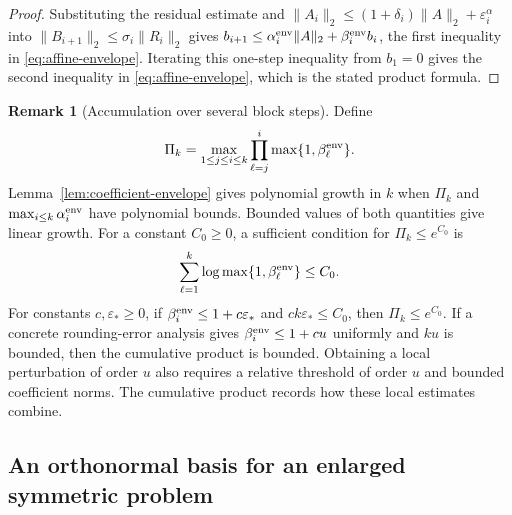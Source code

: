 \documentclass[11pt]{article}
\theoremstyle{definition}
\newtheorem{remark}{Remark}
\newcommand{\eps}{\varepsilon}
\begin{document}
\begin{proof}
Substituting the residual estimate and
$\|A_i\|_2\le(1+\delta_i)\|A\|_2+\eps_i^\alpha$ into
$\|B_{i+1}\|_2\le\sigma_i\|R_i\|_2$ gives
$b_{i+1}\le\alpha_i^{\rm env}\|A\|_2+\beta_i^{\rm env}b_i$, the first
inequality in \eqref{eq:affine-envelope}.  Iterating this one-step inequality
from $b_1=0$ gives the second inequality in \eqref{eq:affine-envelope}, which
is the stated product formula.
\end{proof}

\begin{remark}[Accumulation over several block steps]
Define
\[
 \Pi_k=\max_{1\le j\le i\le k}
 \prod_{\ell=j}^{i}\max\{1,\beta_\ell^{\rm env}\}.
\]
Lemma~\ref{lem:coefficient-envelope} gives polynomial growth in $k$ when
$\Pi_k$ and $\max_{i\le k}\alpha_i^{\rm env}$ have polynomial bounds.
Bounded values of both quantities give linear growth.  For a constant
$C_0\ge0$, a sufficient condition for $\Pi_k\le e^{C_0}$ is
\[
 \sum_{\ell=1}^k\log\max\{1,\beta_\ell^{\rm env}\}\le C_0.
\]
For constants $c,\varepsilon_*\ge0$, if $\beta_i^{\rm env}\le1+c\varepsilon_*$ and
$ck\varepsilon_*\le C_0$, then $\Pi_k\le e^{C_0}$.  If a concrete rounding-error
analysis gives $\beta_i^{\rm env}\le1+cu$ uniformly and $ku$ is bounded, then the
cumulative product is bounded.  Obtaining a local perturbation of order $u$
also requires a relative threshold of order $u$ and bounded coefficient
norms.  The cumulative product records how these local estimates combine.
\end{remark}

\subsection{An orthonormal basis for an enlarged symmetric problem}
\label{sec:orthonormalized}
\end{document}
